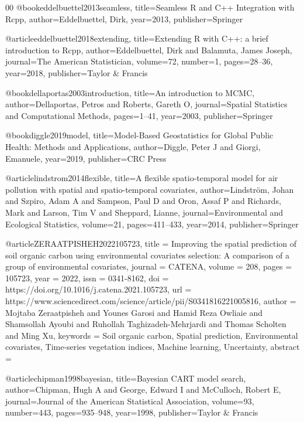 \documentclass[preprint,12pt]{elsarticle}
\begin{document}
\begin{thebibliography}{00}
@book{eddelbuettel2013seamless,
  title={Seamless {R} and {C}++ Integration with {R}cpp},
  author={Eddelbuettel, Dirk},
  year={2013},
  publisher={Springer}
}

@article{eddelbuettel2018extending,
  title={{Extending R with C++: a brief introduction to Rcpp}},
  author={Eddelbuettel, Dirk and Balamuta, James Joseph},
  journal={The American Statistician},
  volume={72},
  number={1},
  pages={28--36},
  year={2018},
  publisher={Taylor \& Francis}
}




@book{dellaportas2003introduction,
  title={An introduction to {MCMC}},
  author={Dellaportas, Petros and Roberts, Gareth O},
  journal={Spatial Statistics and Computational Methods},
  pages={1--41},
  year={2003},
  publisher={Springer}
}

@book{diggle2019model,
  title={Model-Based Geostatistics for Global Public Health: Methods and Applications},
  author={Diggle, Peter J and Giorgi, Emanuele},
  year={2019},
  publisher={CRC Press}
}

@article{lindstrom2014flexible,
  title={A flexible spatio-temporal model for air pollution with spatial and spatio-temporal covariates},
  author={Lindstr{\"o}m, Johan and Szpiro, Adam A and Sampson, Paul D and Oron, Assaf P and Richards, Mark and Larson, Tim V and Sheppard, Lianne},
  journal={Environmental and Ecological Statistics},
  volume={21},
  pages={411--433},
  year={2014},
  publisher={Springer}
}

@article{ZERAATPISHEH2022105723,
title = {Improving the spatial prediction of soil organic carbon using environmental covariates selection: A comparison of a group of environmental covariates},
journal = {CATENA},
volume = {208},
pages = {105723},
year = {2022},
issn = {0341-8162},
doi = {https://doi.org/10.1016/j.catena.2021.105723},
url = {https://www.sciencedirect.com/science/article/pii/S0341816221005816},
author = {Mojtaba Zeraatpisheh and Younes Garosi and Hamid {Reza Owliaie} and Shamsollah Ayoubi and Ruhollah Taghizadeh-Mehrjardi and Thomas Scholten and Ming Xu},
keywords = {Soil organic carbon, Spatial prediction, Environmental covariates, Time-series vegetation indices, Machine learning, Uncertainty},
abstract = {}
}

@article{chipman1998bayesian,
  title={{Bayesian CART model search}},
  author={Chipman, Hugh A and George, Edward I and McCulloch, Robert E},
  journal={Journal of the American Statistical Association},
  volume={93},
  number={443},
  pages={935--948},
  year={1998},
  publisher={Taylor \& Francis}
}


\end{thebibliography}
\end{document}
